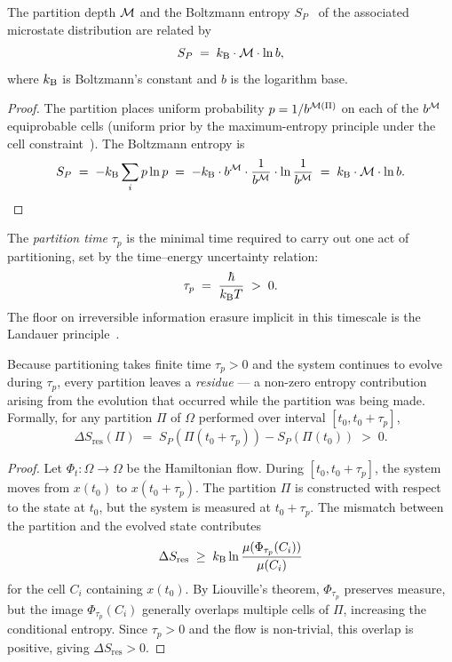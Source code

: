 \begin{theorem}
\label{thm:depth-entropy}
The partition depth $\mathcal{M}$ and the Boltzmann entropy $S_P$~\citep{Shannon1948,Jaynes1957} of the
associated microstate distribution are related by
\[
  S_P \;=\; k_{\mathrm{B}} \cdot \mathcal{M} \cdot \ln b ,
\]
where $k_{\mathrm{B}}$ is Boltzmann's constant and $b$ is the logarithm base.
\end{theorem}

\begin{proof}
The partition places uniform probability $p = 1/b^{\mathcal{M}(\Pi)}$ on each
of the $b^{\mathcal{M}}$ equiprobable cells (uniform prior by the maximum-entropy
principle under the cell constraint~\citep{Jaynes1957}).  The Boltzmann entropy is
\[
  S_P \;=\; -k_{\mathrm{B}} \sum_i p \ln p
  \;=\; -k_{\mathrm{B}} \cdot b^{\mathcal{M}} \cdot \frac{1}{b^{\mathcal{M}}} \cdot
  \ln \frac{1}{b^{\mathcal{M}}}
  \;=\; k_{\mathrm{B}} \cdot \mathcal{M} \cdot \ln b .  \qedhere
\]
\end{proof}

\begin{definition}
\label{def:partition-time}
The \emph{partition time} $\tau_p$ is the minimal time required to carry out
one act of partitioning, set by the time--energy uncertainty relation:
\[
  \tau_p \;=\; \frac{\hbar}{k_{\mathrm{B}} T} \;>\; 0 .
\]
The floor on irreversible information erasure implicit in this timescale is
the Landauer principle~\citep{Landauer1961}.
\end{definition}

\begin{theorem}
\label{thm:residue}
Because partitioning takes finite time $\tau_p > 0$ and the system continues
to evolve during $\tau_p$, every partition leaves a \emph{residue} — a
non-zero entropy contribution arising from the evolution that occurred while
the partition was being made.  Formally, for any partition $\Pi$ of $\Omega$
performed over interval $[t_0, t_0 + \tau_p]$,
\[
  \Delta S_{\mathrm{res}}(\Pi) \;=\; S_P(\Pi(t_0 + \tau_p)) - S_P(\Pi(t_0))
  \;>\; 0 .
\]
\end{theorem}

\begin{proof}
Let $\Phi_t : \Omega \to \Omega$ be the Hamiltonian flow.  During $[t_0,
t_0 + \tau_p]$, the system moves from $x(t_0)$ to $x(t_0 + \tau_p)$.  The
partition $\Pi$ is constructed with respect to the state at $t_0$, but the
system is measured at $t_0 + \tau_p$.  The mismatch between the partition
and the evolved state contributes
\[
  \Delta S_{\mathrm{res}} \;\geq\; k_{\mathrm{B}} \ln \frac{\mu(\Phi_{\tau_p}(C_i))}{\mu(C_i)}
\]
for the cell $C_i$ containing $x(t_0)$.  By Liouville's theorem, $\Phi_{\tau_p}$
preserves measure, but the image $\Phi_{\tau_p}(C_i)$ generally overlaps
multiple cells of $\Pi$, increasing the conditional entropy.  Since $\tau_p > 0$
and the flow is non-trivial, this overlap is positive, giving
$\Delta S_{\mathrm{res}} > 0$.
\end{proof}

